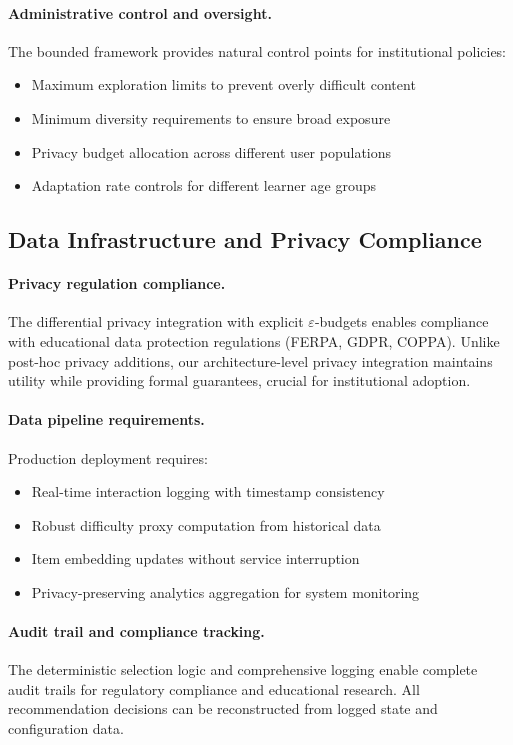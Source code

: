 \paragraph{Administrative control and oversight.} The bounded framework provides natural control points for institutional policies:
\begin{itemize}
  \item Maximum exploration limits to prevent overly difficult content
  \item Minimum diversity requirements to ensure broad exposure
  \item Privacy budget allocation across different user populations
  \item Adaptation rate controls for different learner age groups
\end{itemize}

\subsection{Data Infrastructure and Privacy Compliance}
\label{app:data-infrastructure}

\paragraph{Privacy regulation compliance.} The differential privacy integration with explicit $\varepsilon$-budgets enables compliance with educational data protection regulations (FERPA, GDPR, COPPA). Unlike post-hoc privacy additions, our architecture-level privacy integration maintains utility while providing formal guarantees, crucial for institutional adoption.

\paragraph{Data pipeline requirements.} Production deployment requires:
\begin{itemize}
  \item Real-time interaction logging with timestamp consistency
  \item Robust difficulty proxy computation from historical data
  \item Item embedding updates without service interruption
  \item Privacy-preserving analytics aggregation for system monitoring
\end{itemize}

\paragraph{Audit trail and compliance tracking.} The deterministic selection logic and comprehensive logging enable complete audit trails for regulatory compliance and educational research. All recommendation decisions can be reconstructed from logged state and configuration data.

